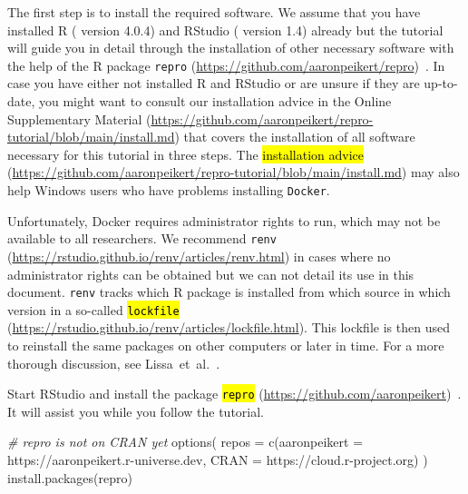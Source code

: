 \documentclass[psych,tutorial,accept,moreauthors,pdftex]{Definitions/mdpi}
\newenvironment{Shaded}{\begin{snugshade}}{\end{snugshade}}
\newcommand{\AttributeTok}[1]{\textcolor[rgb]{0.77,0.63,0.00}{#1}}
\newcommand{\CommentTok}[1]{\textcolor[rgb]{0.56,0.35,0.01}{\textit{#1}}}
\newcommand{\FunctionTok}[1]{\textcolor[rgb]{0.00,0.00,0.00}{#1}}
\newcommand{\NormalTok}[1]{#1}
\newcommand{\StringTok}[1]{\textcolor[rgb]{0.31,0.60,0.02}{#1}}
\begin{document}
The first step is to install the required software. We assume that you
have installed R (\citep{R-base} version 4.0.4) and RStudio
(\citep{rstudio} version 1.4) already but the tutorial will guide you in
detail through the installation of other necessary software with the
help of the R package {\texttt{repro}} 
(\url{https://github.com/aaronpeikert/repro})~\citep{R-repro}. In case you have either not installed R and RStudio or
are unsure if they are up-to-date, you might want to consult our
installation advice in the Online Supplementary Material
(\url{https://github.com/aaronpeikert/repro-tutorial/blob/main/install.md}) that covers the installation of all software
necessary for this tutorial in three steps. The
\hl{installation advice} %
(\url{https://github.com/aaronpeikert/repro-tutorial/blob/main/install.md}) may also help Windows users who have problems installing
\texttt{Docker}.

Unfortunately, Docker requires administrator rights to run, which may
not be available to all researchers. We recommend {\texttt{renv}}
(\url{https://rstudio.github.io/renv/articles/renv.html})
\citep{R-renv} in cases where no administrator rights can be obtained
but we can not detail its use in this document. \texttt{renv} tracks which
R package is installed from which source in which version in a so-called \hl{\texttt{lockfile}}
(\url{https://rstudio.github.io/renv/articles/lockfile.html}).
This lockfile is then used to reinstall the same packages on other
computers or later in time. For a more thorough discussion, see
Lissa~et~al.~\citep{vanlissa2020worcs}.

Start RStudio and install the package \hl{\texttt{repro}}
(\url{https://github.com/aaronpeikert})~\citep{R-repro}.
It will assist you while you follow the tutorial.

\begin{adjustwidth}{0.5cm}{0cm} 
\begin{Shaded}
\begin{Highlighting}[]
\CommentTok{\# repro is not on CRAN yet}
\FunctionTok{options}\NormalTok{(}
  \AttributeTok{repos =} \FunctionTok{c}\NormalTok{(}\AttributeTok{aaronpeikert =} \StringTok{\textquotesingle{}https://aaronpeikert.r{-}universe.dev\textquotesingle{}}\NormalTok{,}
            \AttributeTok{CRAN =} \StringTok{\textquotesingle{}https://cloud.r{-}project.org\textquotesingle{}}\NormalTok{)}
\NormalTok{)}
\FunctionTok{install.packages}\NormalTok{(}\StringTok{\textquotesingle{}repro\textquotesingle{}}\NormalTok{)}
\end{Highlighting}
\end{Shaded}
\end{adjustwidth}
\end{document}
